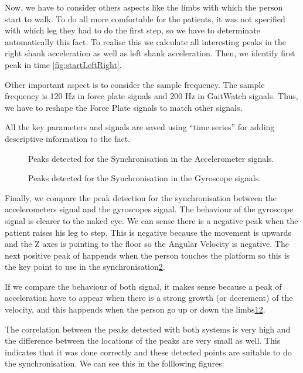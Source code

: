 Now, we have to consider others aspects like the limbs with which the person start to walk. To do all more comfortable for the patients, it was not specified with which leg they had to do the first step, so we have to determinate automatically this fact. To realise this we calculate all interesting peaks in the right shank acceleration as well as left shank acceleration. Then, we identify first peak in time \ref{fig:startLeftRight}.

Other important aspect is to consider the sample frequency. The sample frequency is 120 Hz in force plate signals and 200 Hz in GaitWatch signals. Thus, we have to reshape the Force Plate signals to match other signals.

All the key parameters and signals are saved using “time series”  for adding descriptive information to the fact.

\begin{figure}[H]
	\centering
	\caption{Peaks detected for the Synchronisation in the Accelerometer signals.}
	\label{fig:pointdetectionAcc}
\end{figure}

\begin{figure}[H]
	\centering
	\caption{Peaks detected for the Synchronisation in the Gyroscope signals.}
	\label{fig:pointdetectionGyro}
\end{figure}

Finally, we compare the peak detection for the synchronisation between the accelerometers signal and the gyroscopes signal. The behaviour of the gyroscope signal is clearer to the naked eye. We can sense there is a negative peak when the patient raises his leg to step. This is negative because the movement is upwards and the Z axes is pointing to the floor so the Angular Velocity is negative. The next positive peak of happends when the person touches the platform so this is the key point to use in the synchronisation\ref{fig:pointdetectionGyro}.

If we compare the behaviour of both signal, it makes sense because a peak of acceleration have to appear when there is a strong growth (or decrement) of the velocity, and this happends when the person go up or down the limbs\ref{fig:pointdetectionAcc}\ref{fig:pointdetectionGyro}.

The correlation between the peaks detected with both systems is very high and the difference between the locations of the peaks are very small as well. This indicates that it was done correctly and these detected points are suitable to do the synchronisation. We can see this in the folllowing figures:

